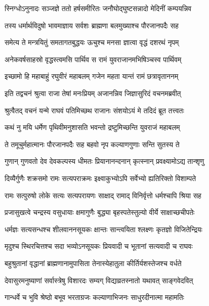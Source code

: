 \twolineshloka
{स्निग्धोऽनुनादः सञ्जज्ञे ततो हर्षसमीरितः}
{जनौघोद्घुष्टसन्नादो मेदिनीं कम्पयन्निव} %

\twolineshloka
{तस्य धर्मार्थविदुषो भावमाज्ञाय सर्वशः}
{ब्राह्मणा बलमुख्याश्च पौरजानपदैः सह} %

\twolineshloka
{समेत्य ते मन्त्रयितुं समतागतबुद्धयः}
{ऊचुश्च मनसा ज्ञात्वा वृद्धं दशरथं नृपम्} %

\twolineshloka
{अनेकवर्षसाहस्रो वृद्धस्त्वमसि पार्थिव}
{स रामं युवराजानमभिषिञ्चस्व पार्थिवम्} %

\twolineshloka
{इच्छामो हि महाबाहुं रघुवीरं महाबलम्}
{गजेन महता यान्तं रामं छत्रावृताननम्} %

\twolineshloka
{इति तद्वचनं श्रुत्वा राजा तेषां मनःप्रियम्}
{अजानन्निव जिज्ञासुरिदं वचनमब्रवीत्} %

\twolineshloka
{श्रुत्वैतद् वचनं यन्मे राघवं पतिमिच्छथ}
{राजानः संशयोऽयं मे तदिदं ब्रूत तत्त्वतः} %

\twolineshloka
{कथं नु मयि धर्मेण पृथिवीमनुशासति}
{भवन्तो द्रष्टुमिच्छन्ति युवराजं महाबलम्} %

\twolineshloka
{ते तमूचुर्महात्मानः पौरजानपदैः सह}
{बहवो नृप कल्याणगुणाः सन्ति सुतस्य ते} %

\twolineshloka
{गुणान् गुणवतो देव देवकल्पस्य धीमतः}
{प्रियानानन्दनान् कृत्स्नान् प्रवक्ष्यामोऽद्य तान्शृणु} %

\twolineshloka
{दिव्यैर्गुणैः शक्रसमो रामः सत्यपराक्रमः}
{इक्ष्वाकुभ्योऽपि सर्वेभ्यो ह्यतिरिक्तो विशाम्पते} %

\twolineshloka
{रामः सत्पुरुषो लोके सत्यः सत्यपरायणः}
{साक्षाद् रामाद् विनिर्वृत्तो धर्मश्चापि श्रिया सह} %

\twolineshloka
{प्रजासुखत्वे चन्द्रस्य वसुधायाः क्षमागुणैः}
{बुद्ध्या बृहस्पतेस्तुल्यो वीर्ये साक्षाच्छचीपतेः} %

\twolineshloka
{धर्मज्ञः सत्यसन्धश्च शीलवाननसूयकः}
{क्षान्तः सान्त्वयिता श्लक्ष्णः कृतज्ञो विजितेन्द्रियः} %

\twolineshloka
{मृदुश्च स्थिरचित्तश्च सदा भव्योऽनसूयकः}
{प्रियवादी च भूतानां सत्यवादी च राघवः} %

\twolineshloka
{बहुश्रुतानां वृद्धानां ब्राह्मणानामुपासिता}
{तेनास्येहातुला कीर्तिर्यशस्तेजश्च वर्धते} %

\twolineshloka
{देवासुरमनुष्याणां सर्वास्त्रेषु विशारदः}
{सम्यग् विद्याव्रतस्नातो यथावत् साङ्गवेदवित्} %

\twolineshloka
{गान्धर्वे च भुवि श्रेष्ठो बभूव भरताग्रजः}
{कल्याणाभिजनः साधुरदीनात्मा महामतिः} %

